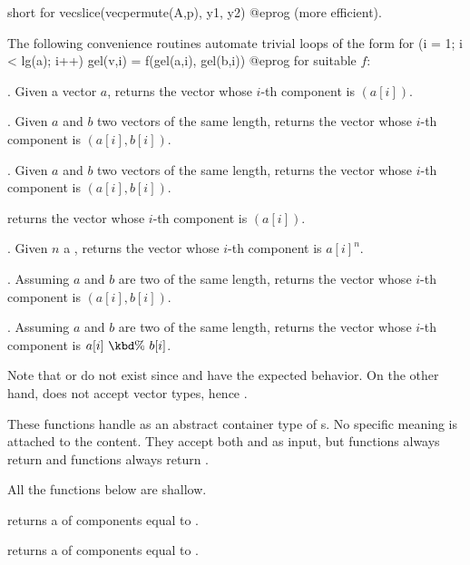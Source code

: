  short for
\bprog
  vecslice(vecpermute(A,p), y1, y2)
@eprog\noindent
(more efficient).


The following convenience routines automate trivial loops of the form
\bprog
  for (i = 1; i < lg(a); i++) gel(v,i) = f(gel(a,i), gel(b,i))
@eprog\noindent
for suitable $f$:

. Given a vector $a$,
returns the vector whose $i$-th component is $(a[i])$.

. Given $a$ and $b$ two vectors of the same
length, returns the vector whose $i$-th component is $(a[i], b[i])$.

. Given $a$ and $b$ two vectors of the same
length, returns the vector whose $i$-th component is $(a[i], b[i])$.

returns the vector whose $i$-th component is $(a[i])$.

. Given $n$ a , returns
the vector whose $i$-th component is $a[i]^n$.

. Assuming $a$ and $b$ are two 
of the same length, returns the vector whose $i$-th component
is $(a[i], b[i])$.

. Assuming $a$ and $b$ are two 
of the same length, returns the vector whose $i$-th component
is $a[i]~\kbd{\%}~b[i]$.

Note that  or  do not exist since 
and  have the expected behavior. On the other hand,
 does not accept vector types, hence .


These functions handle  as an abstract container type of
s. No specific meaning is attached to the content. They accept both
 and  as input, but  functions always return
 and  functions always return .

 All the functions below are shallow.

 returns a  of  components
equal to .

 returns a  of  components
equal to .


